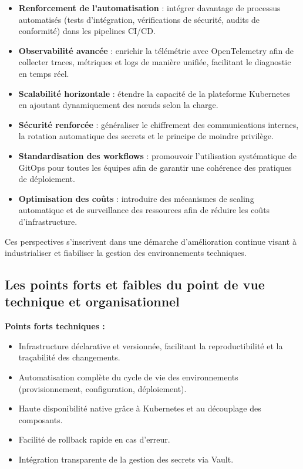 \begin{itemize}
	\item \textbf{Renforcement de l’automatisation} : intégrer davantage de processus automatisés (tests d’intégration, vérifications de sécurité, audits de conformité) dans les pipelines CI/CD.

	\item \textbf{Observabilité avancée} : enrichir la télémétrie avec OpenTelemetry afin de collecter traces, métriques et logs de manière unifiée, facilitant le diagnostic en temps réel.

	\item \textbf{Scalabilité horizontale} : étendre la capacité de la plateforme Kubernetes en ajoutant dynamiquement des nœuds selon la charge.

	\item \textbf{Sécurité renforcée} : généraliser le chiffrement des communications internes, la rotation automatique des secrets et le principe de moindre privilège.

	\item \textbf{Standardisation des workflows} : promouvoir l’utilisation systématique de GitOps pour toutes les équipes afin de garantir une cohérence des pratiques de déploiement.

	\item \textbf{Optimisation des coûts} : introduire des mécanismes de scaling automatique et de surveillance des ressources afin de réduire les coûts d’infrastructure.
\end{itemize}

Ces perspectives s’inscrivent dans une démarche d’amélioration continue visant à industrialiser et fiabiliser la gestion des environnements techniques.

\subsection{Les points forts et faibles du point de vue technique et organisationnel}

\textbf{Points forts techniques :}
\begin{itemize}
	\item Infrastructure déclarative et versionnée, facilitant la reproductibilité et la traçabilité des changements.
	\item Automatisation complète du cycle de vie des environnements (provisionnement, configuration, déploiement).
	\item Haute disponibilité native grâce à Kubernetes et au découplage des composants.
	\item Facilité de rollback rapide en cas d’erreur.
	\item Intégration transparente de la gestion des secrets via Vault.
\end{itemize}

